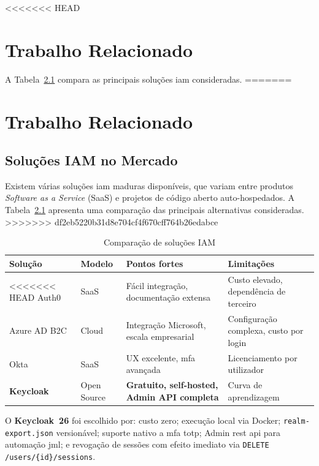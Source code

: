 <<<<<<< HEAD
\chapter{Trabalho Relacionado}
\label{chap:trabalho_relacionado}

A Tabela~\ref{tab:comparacao_iam} compara as principais soluções \gls{iam} consideradas.
=======
\chapter{Trabalho Relacionado}
\label{chap:trabalho_relacionado}

\section{Soluções IAM no Mercado}

Existem várias soluções \gls{iam} maduras disponíveis, que variam entre produtos \textit{Software as a Service} (SaaS) e projetos de código aberto auto-hospedados. A Tabela~\ref{tab:comparacao_iam} apresenta uma comparação das principais alternativas consideradas.
>>>>>>> df2eb5220b31d8e704cf4f670cff764b26edabce

\begin{table}[h!]
\centering
\caption{Comparação de soluções IAM}
\label{tab:comparacao_iam}
\begin{tabularx}{\textwidth}{|l|l|X|X|}
\hline
\textbf{Solução} & \textbf{Modelo} & \textbf{Pontos fortes} & \textbf{Limitações} \\ \hline
<<<<<<< HEAD
Auth0 & SaaS & Fácil integração, documentação extensa & Custo elevado, dependência de terceiro \\ \hline
Azure AD B2C & Cloud & Integração Microsoft, escala empresarial & Configuração complexa, custo por login \\ \hline
Okta & SaaS & UX excelente, \gls{mfa} avançada & Licenciamento por utilizador \\ \hline
\textbf{Keycloak} & Open Source & \textbf{Gratuito, self-hosted, Admin API completa} & Curva de aprendizagem \\ \hline
\end{tabularx}
\end{table}

O \textbf{Keycloak~26} \cite{KeycloakDocs} foi escolhido por: custo zero; execução local via Docker; \texttt{realm-export.json} versionável; suporte nativo a \gls{mfa} \gls{totp}; Admin \gls{rest} \gls{api} para automação \gls{jml}; e revogação de sessões com efeito imediato via \texttt{DELETE /users/\{id\}/sessions}.

